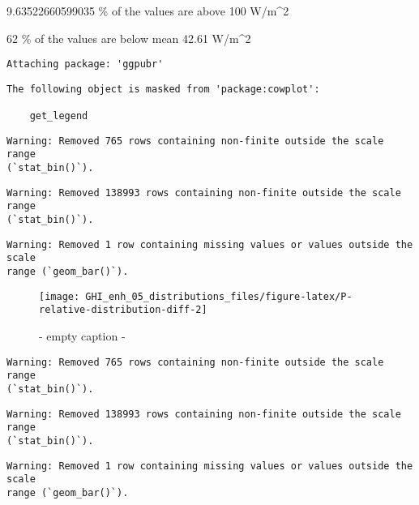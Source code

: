 \documentclass[
  10pt,
  a4paper,oneside]{article}
\begin{document}
9.63522660599035 \% of the values are above 100 W/m\^{}2

62 \% of the values are below mean 42.61 W/m\^{}2

\begin{verbatim}
Attaching package: 'ggpubr'
\end{verbatim}

\begin{verbatim}
The following object is masked from 'package:cowplot':

    get_legend
\end{verbatim}

\begin{verbatim}
Warning: Removed 765 rows containing non-finite outside the scale range
(`stat_bin()`).
\end{verbatim}

\begin{verbatim}
Warning: Removed 138993 rows containing non-finite outside the scale range
(`stat_bin()`).
\end{verbatim}

\begin{verbatim}
Warning: Removed 1 row containing missing values or values outside the scale
range (`geom_bar()`).
\end{verbatim}

\begin{figure}[H]

{\centering \texttt{[image: GHI\_enh\_05\_distributions\_files/figure-latex/P-relative-distribution-diff-2]} 

}

\caption{ - empty caption - }\label{fig:P-relative-distribution-diff-2}
\end{figure}

\begin{verbatim}
Warning: Removed 765 rows containing non-finite outside the scale range
(`stat_bin()`).
\end{verbatim}

\begin{verbatim}
Warning: Removed 138993 rows containing non-finite outside the scale range
(`stat_bin()`).
\end{verbatim}

\begin{verbatim}
Warning: Removed 1 row containing missing values or values outside the scale
range (`geom_bar()`).
\end{verbatim}
\end{document}
